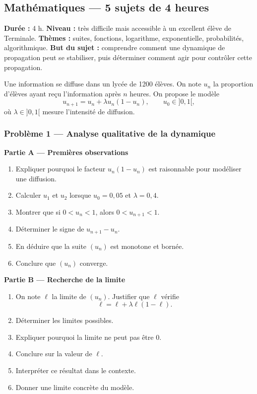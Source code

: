 \documentclass[11pt,a4paper]{article}
\begin{document}
\subsection{Mathématiques — 5 sujets de 4 heures}

\hypertarget{M-EXCELLENCE-01}{}
\begin{difficile}
\textbf{Durée :} 4 h.  
\textbf{Niveau :} très difficile mais accessible à un excellent élève de Terminale.  
\textbf{Thèmes :} suites, fonctions, logarithme, exponentielle, probabilités, algorithmique.  
\textbf{But du sujet :} comprendre comment une dynamique de propagation peut se stabiliser, puis déterminer comment agir pour contrôler cette propagation.

\medskip

Une information se diffuse dans un lycée de 1200 élèves. On note $u_n$ la proportion d'élèves ayant reçu l'information après $n$ heures. On propose le modèle
\[
u_{n+1}=u_n+\lambda u_n(1-u_n),
\qquad u_0\in]0,1[,
\]
où $\lambda\in]0,1[$ mesure l'intensité de diffusion.

\subsubsection*{Problème 1 — Analyse qualitative de la dynamique}

\textbf{Partie A — Premières observations}
\begin{enumerate}
  \item Expliquer pourquoi le facteur $u_n(1-u_n)$ est raisonnable pour modéliser une diffusion.
  \item Calculer $u_1$ et $u_2$ lorsque $u_0=0{,}05$ et $\lambda=0{,}4$.
  \item Montrer que si $0<u_n<1$, alors $0<u_{n+1}<1$.
  \item Déterminer le signe de $u_{n+1}-u_n$.
  \item En déduire que la suite $(u_n)$ est monotone et bornée.
  \item Conclure que $(u_n)$ converge.
\end{enumerate}

\textbf{Partie B — Recherche de la limite}
\begin{enumerate}
  \item On note $\ell$ la limite de $(u_n)$. Justifier que $\ell$ vérifie
  \[
  \ell=\ell+\lambda \ell(1-\ell).
  \]
  \item Déterminer les limites possibles.
  \item Expliquer pourquoi la limite ne peut pas être $0$.
  \item Conclure sur la valeur de $\ell$.
  \item Interpréter ce résultat dans le contexte.
  \item Donner une limite concrète du modèle.
\end{enumerate}


\end{difficile}
\end{document}
